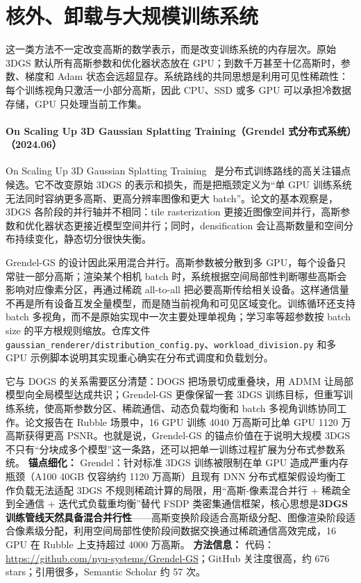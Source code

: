 \section{核外、卸载与大规模训练系统}

这一类方法不一定改变高斯的数学表示，而是改变训练系统的内存层次。原始 3DGS 默认所有高斯参数和优化器状态放在 GPU；到数千万甚至十亿高斯时，参数、梯度和 Adam 状态会远超显存。系统路线的共同思想是利用可见性稀疏性：每个训练视角只激活一小部分高斯，因此 CPU、SSD 或多 GPU 可以承担冷数据存储，GPU 只处理当前工作集。
\paragraph{On Scaling Up 3D Gaussian Splatting Training（Grendel 式分布式系统）（2024.06）}
On Scaling Up 3D Gaussian Splatting Training~\cite{2406_18533} 是分布式训练路线的高关注锚点候选。它不改变原始 3DGS 的表示和损失，而是把瓶颈定义为“单 GPU 训练系统无法同时容纳更多高斯、更高分辨率图像和更大 batch”。论文的基本观察是，3DGS 各阶段的并行轴并不相同：tile rasterization 更接近图像空间并行，高斯参数和优化器状态更接近模型空间并行；同时，densification 会让高斯数量和空间分布持续变化，静态切分很快失衡。

Grendel-GS 的设计因此采用混合并行。高斯参数被分散到多 GPU，每个设备只常驻一部分高斯；渲染某个相机 batch 时，系统根据空间局部性判断哪些高斯会影响对应像素分区，再通过稀疏 all-to-all 把必要高斯传给相关设备。这样通信量不再是所有设备互发全量模型，而是随当前视角和可见区域变化。训练循环还支持 batch 多视角，而不是原始实现中一次主要处理单视角；学习率等超参数按 batch size 的平方根规则缩放。仓库文件 \texttt{gaussian\_renderer/distribution\_config.py}、\texttt{workload\_division.py} 和多 GPU 示例脚本说明其实现重心确实在分布式调度和负载划分。

它与 DOGS 的关系需要区分清楚：DOGS 把场景切成重叠块，用 ADMM 让局部模型向全局模型达成共识；Grendel-GS 更像保留一套 3DGS 训练目标，但重写训练系统，使高斯参数分区、稀疏通信、动态负载均衡和 batch 多视角训练协同工作。论文报告在 Rubble 场景中，16 GPU 训练 4040 万高斯可比单 GPU 1120 万高斯获得更高 PSNR。也就是说，Grendel-GS 的锚点价值在于说明大规模 3DGS 不只有“分块成多个模型”这一条路，还可以把单一训练过程扩展为分布式参数系统。
\textbf{锚点细化：} Grendel：针对标准 3DGS 训练被限制在单 GPU 造成严重内存瓶颈（A100 40GB 仅容纳约 1120 万高斯）且现有 DNN 分布式框架假设均衡工作负载无法适配 3DGS 不规则稀疏计算的局限，用``高斯-像素混合并行 + 稀疏全到全通信 + 迭代式负载重均衡''替代 FSDP 类密集通信框架，核心思想是\textbf{3DGS 训练管线天然具备混合并行性}——高斯变换阶段适合高斯级分配、图像渲染阶段适合像素级分配，利用空间局部性使阶段间数据交换通过稀疏通信高效完成，16 GPU 在 Rubble 上支持超过 4000 万高斯。
\textbf{方法信息：} 代码：\url{https://github.com/nyu-systems/Grendel-GS}；GitHub 关注度很高，约 676 stars；引用很多，Semantic Scholar 约 57 次。



